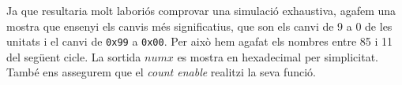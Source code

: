 Ja que resultaria molt laboriós comprovar una simulació exhaustiva, agafem una mostra que ensenyi els canvis més significatius, que son els canvi de 9 a 0 de les unitats i el canvi de \texttt{0x99} a \texttt{0x00}. Per això hem agafat els nombres entre 85 i 11 del següent cicle. La sortida $numx$ es mostra en hexadecimal per simplicitat. També ens assegurem que el \emph{count enable} realitzi la seva funció.

\vspace{1cm}
